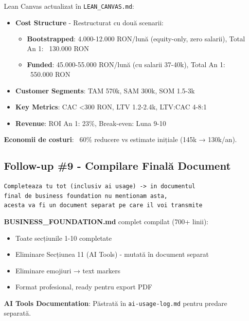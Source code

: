 \documentclass[11pt,a4paper]{article}
\begin{document}
\begin{tcolorbox}[colback=outputbackground,colframe=green!75!black,title=Output Generat]
Lean Canvas actualizat în \texttt{LEAN\_CANVAS.md}:
\begin{itemize}[leftmargin=*]
    \item \textbf{Cost Structure} - Restructurat cu două scenarii:
    \begin{itemize}
        \item \textbf{Bootstrapped}: 4.000-12.000 RON/lună (equity-only, zero salarii), Total An 1: ~130.000 RON
        \item \textbf{Funded}: 45.000-55.000 RON/lună (cu salarii 37-40k), Total An 1: ~550.000 RON
    \end{itemize}
    \item \textbf{Customer Segments}: TAM 570k, SAM 300k, SOM 1.5-3k
    \item \textbf{Key Metrics}: CAC <300 RON, LTV 1.2-2.4k, LTV:CAC 4-8:1
    \item \textbf{Revenue}: ROI An 1: 23\%, Break-even: Luna 9-10
\end{itemize}

\textbf{Economii de costuri}: ~60\% reducere vs estimate inițiale (145k → 130k/an).
\end{tcolorbox}

\subsection{Follow-up \#9 - Compilare Finală Document}

\begin{tcolorbox}[colback=promptbackground,colframe=blue!75!black,title=Prompt Input]
\begin{verbatim}
Completeaza tu tot (inclusiv ai usage) -> in documentul
final de business foundation nu mentionam asta,
acesta va fi un document separat pe care il voi transmite
\end{verbatim}
\end{tcolorbox}

\begin{tcolorbox}[colback=outputbackground,colframe=green!75!black,title=Output Generat]
\textbf{BUSINESS\_FOUNDATION.md} complet compilat (700+ linii):
\begin{itemize}[leftmargin=*]
    \item Toate secțiunile 1-10 completate
    \item Eliminare Secțiunea 11 (AI Tools) - mutată în document separat
    \item Eliminare emojiuri → text markers
    \item Format profesional, ready pentru export PDF
\end{itemize}

\textbf{AI Tools Documentation}: Păstrată în \texttt{ai-usage-log.md} pentru predare separată.
\end{tcolorbox}
\end{document}
